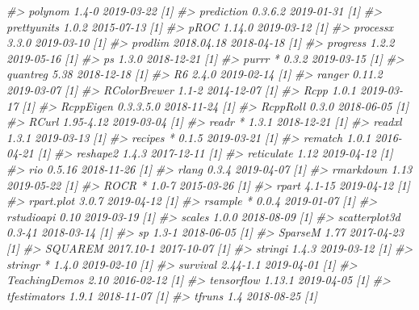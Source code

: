 \documentclass[]{krantz}
\makeatletter
\newenvironment{Shaded}{\begin{snugshade}}{\end{snugshade}}
\newcommand{\CommentTok}[1]{\textcolor[rgb]{0.37,0.37,0.37}{\textit{#1}}}
\newenvironment{kframe}{%
\medskip{}
\setlength{\fboxsep}{.8em}
 \def\at@end@of@kframe{}%
 \ifinner\ifhmode%
  \def\at@end@of@kframe{\end{minipage}}%
  \begin{minipage}{\columnwidth}%
 \fi\fi%
 \def\FrameCommand##1{\hskip\@totalleftmargin \hskip-\fboxsep
 \colorbox{shadecolor}{##1}\hskip-\fboxsep
     \hskip-\linewidth \hskip-\@totalleftmargin \hskip\columnwidth}%
 \MakeFramed {\advance\hsize-\width
   \@totalleftmargin\z@ \linewidth\hsize
   \@setminipage}}%
 {\par\unskip\endMakeFramed%
 \at@end@of@kframe}
\renewenvironment{Shaded}{\begin{kframe}}{\end{kframe}}
\makeatother
\begin{document}
\begin{Shaded}
\begin{Highlighting}[]
\CommentTok{#>    polynom         1.4-0      2019-03-22 [1]}
\CommentTok{#>    prediction      0.3.6.2    2019-01-31 [1]}
\CommentTok{#>    prettyunits     1.0.2      2015-07-13 [1]}
\CommentTok{#>    pROC            1.14.0     2019-03-12 [1]}
\CommentTok{#>    processx        3.3.0      2019-03-10 [1]}
\CommentTok{#>    prodlim         2018.04.18 2018-04-18 [1]}
\CommentTok{#>    progress        1.2.2      2019-05-16 [1]}
\CommentTok{#>    ps              1.3.0      2018-12-21 [1]}
\CommentTok{#>    purrr         * 0.3.2      2019-03-15 [1]}
\CommentTok{#>    quantreg        5.38       2018-12-18 [1]}
\CommentTok{#>    R6              2.4.0      2019-02-14 [1]}
\CommentTok{#>    ranger          0.11.2     2019-03-07 [1]}
\CommentTok{#>    RColorBrewer    1.1-2      2014-12-07 [1]}
\CommentTok{#>    Rcpp            1.0.1      2019-03-17 [1]}
\CommentTok{#>    RcppEigen       0.3.3.5.0  2018-11-24 [1]}
\CommentTok{#>    RcppRoll        0.3.0      2018-06-05 [1]}
\CommentTok{#>    RCurl           1.95-4.12  2019-03-04 [1]}
\CommentTok{#>    readr         * 1.3.1      2018-12-21 [1]}
\CommentTok{#>    readxl          1.3.1      2019-03-13 [1]}
\CommentTok{#>    recipes       * 0.1.5      2019-03-21 [1]}
\CommentTok{#>    rematch         1.0.1      2016-04-21 [1]}
\CommentTok{#>    reshape2        1.4.3      2017-12-11 [1]}
\CommentTok{#>    reticulate      1.12       2019-04-12 [1]}
\CommentTok{#>    rio             0.5.16     2018-11-26 [1]}
\CommentTok{#>    rlang           0.3.4      2019-04-07 [1]}
\CommentTok{#>    rmarkdown       1.13       2019-05-22 [1]}
\CommentTok{#>    ROCR          * 1.0-7      2015-03-26 [1]}
\CommentTok{#>    rpart           4.1-15     2019-04-12 [1]}
\CommentTok{#>    rpart.plot      3.0.7      2019-04-12 [1]}
\CommentTok{#>    rsample       * 0.0.4      2019-01-07 [1]}
\CommentTok{#>    rstudioapi      0.10       2019-03-19 [1]}
\CommentTok{#>    scales          1.0.0      2018-08-09 [1]}
\CommentTok{#>    scatterplot3d   0.3-41     2018-03-14 [1]}
\CommentTok{#>    sp              1.3-1      2018-06-05 [1]}
\CommentTok{#>    SparseM         1.77       2017-04-23 [1]}
\CommentTok{#>    SQUAREM         2017.10-1  2017-10-07 [1]}
\CommentTok{#>    stringi         1.4.3      2019-03-12 [1]}
\CommentTok{#>    stringr       * 1.4.0      2019-02-10 [1]}
\CommentTok{#>    survival        2.44-1.1   2019-04-01 [1]}
\CommentTok{#>    TeachingDemos   2.10       2016-02-12 [1]}
\CommentTok{#>    tensorflow      1.13.1     2019-04-05 [1]}
\CommentTok{#>    tfestimators    1.9.1      2018-11-07 [1]}
\CommentTok{#>    tfruns          1.4        2018-08-25 [1]}

\end{Highlighting}
\end{Shaded}
\end{document}
